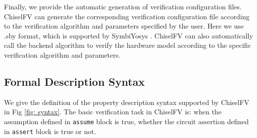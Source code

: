 \documentclass[conference]{IEEEtran}
\theoremstyle{definition}
\begin{document}
Finally, we provide the automatic generation of verification configuration files.
ChiselFV can generate the corresponding verification configuration file according to the verification algorithm and parameters specified by the user. Here we use .sby format, which is supported by SymbiYosys \cite{SymbiYosys}. ChiselFV can also automatically call the backend algorithm to verify the hardware model according to the specific verification algorithm and parameters.

\subsection{Formal Description Syntax}

We give the definition of the property description syntax supported by ChiselFV in Fig \ref{fig: syntax}.
The basic verification task in ChiselFV is: when the assumption defined in \verb|assume| block is true, whether the circuit assertion defined in \verb|assert| block is true or not. 
\end{document}
